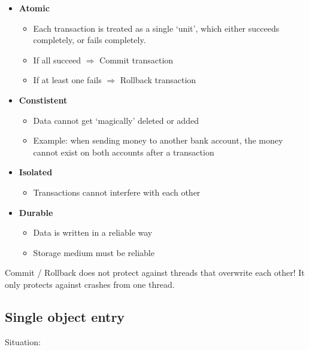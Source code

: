 \documentclass{article}
\begin{document}
\begin{itemize}
    \item \textbf{Atomic}
    \begin{itemize}
        \item Each transaction is treated as a single `unit', which either succeeds completely, or fails completely.
        \item If all succeed $\Rightarrow$ Commit transaction
        \item If at least one fails $\Rightarrow$ Rollback transaction
    \end{itemize}
    \item \textbf{Constistent}
    \begin{itemize}
        \item Data cannot get `magically' deleted or added
        \item Example: when sending money to another bank account, the money cannot exist on both accounts after a transaction
    \end{itemize}
    \item \textbf{Isolated}
    \begin{itemize}
        \item Transactions cannot interfere with each other
    \end{itemize}
    \item \textbf{Durable}
    \begin{itemize}
        \item Data is written in a reliable way 
        \item Storage medium must be reliable
    \end{itemize}
\end{itemize}

Commit / Rollback does not protect against threads that overwrite each other!
It only protects against crashes from one thread.

\subsection{Single object entry}

Situation: 
\end{document}
